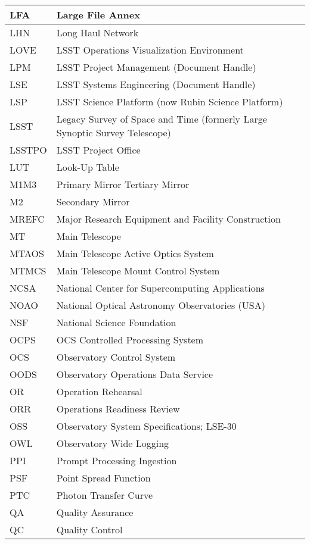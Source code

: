 \begin{longtable}{p{}p{}}
LFA & Large File Annex \\\hline
LHN & Long Haul Network \\\hline
LOVE & LSST Operations Visualization Environment \\\hline
LPM & LSST Project Management (Document Handle) \\\hline
LSE & LSST Systems Engineering (Document Handle) \\\hline
LSP & LSST Science Platform (now Rubin Science Platform) \\\hline
LSST & Legacy Survey of Space and Time (formerly Large Synoptic Survey Telescope) \\\hline
LSSTPO & LSST Project Office \\\hline
LUT & Look-Up Table \\\hline
M1M3 & Primary Mirror Tertiary Mirror \\\hline
M2 & Secondary Mirror \\\hline
MREFC & Major Research Equipment and Facility Construction \\\hline
MT & Main Telescope \\\hline
MTAOS & Main Telescope Active Optics System \\\hline
MTMCS & Main Telescope Mount Control System \\\hline
NCSA & National Center for Supercomputing Applications \\\hline
NOAO & National Optical Astronomy Observatories (USA) \\\hline
NSF & National Science Foundation \\\hline
OCPS & OCS Controlled Processing System \\\hline
OCS & Observatory Control System \\\hline
OODS & Observatory Operations Data Service \\\hline
OR & Operation Rehearsal \\\hline
ORR & Operations Readiness Review \\\hline
OSS & Observatory System Specifications; LSE-30 \\\hline
OWL & Observatory Wide Logging \\\hline
PPI & Prompt Processing Ingestion \\\hline
PSF & Point Spread Function \\\hline
PTC & Photon Transfer Curve \\\hline
QA & Quality Assurance \\\hline
QC & Quality Control \\\hline

\end{longtable}
